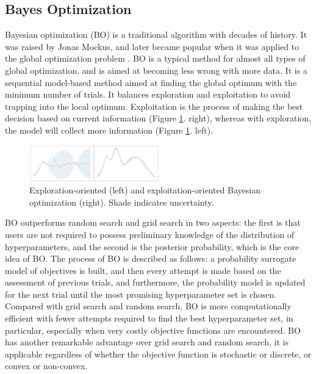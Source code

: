 \documentclass[conference]{IEEEtran}
\begin{document}
\subsection{Bayes Optimization}
Bayesian optimization (BO) is a traditional algorithm with decades of history. It was raised by Jonas Mockus, and later became popular when it was applied to the global optimization problem \cite{jones}. BO is a typical method for almost all types of global optimization, and is aimed at becoming less wrong with more data. It is a sequential model-based method aimed at finding the global optimum with the minimum number of trials. It balances exploration and exploitation to avoid trapping into the local optimum. Exploitation is the process of making the best decision based on current information (Figure \ref{bayes}. right), whereas with exploration, the model will collect more information (Figure \ref{bayes}. left).
\begin{figure}[htbp]
\centerline{\includegraphics[width=0.5\textwidth]{bayes.png}}
\caption{Exploration-oriented (left) and exploitation-oriented Bayesian optimization (right). Shade indicates uncertainty. \cite{yu2020hyperparameter}}
\label{bayes}
\end{figure}

BO outperforms random search and grid search in two aspects: the first is that users are not required to possess preliminary knowledge of the distribution of hyperparameters, and the second is the posterior probability, which is the core idea of BO. The process of BO is described as follows: a probability surrogate model of objectives is built, and then every attempt is made based on the assessment of previous trials, and furthermore, the probability model is updated for the next trial until the most promising hyperparameter set is chosen. Compared with grid search and random search, BO is more computationally efficient with fewer attempts required to find the best hyperparameter set, in particular, especially when very costly objective functions are encountered. BO has another remarkable advantage over grid search and random search, it is applicable regardless of whether the objective function is stochastic or discrete, or convex or non-convex.
\end{document}

